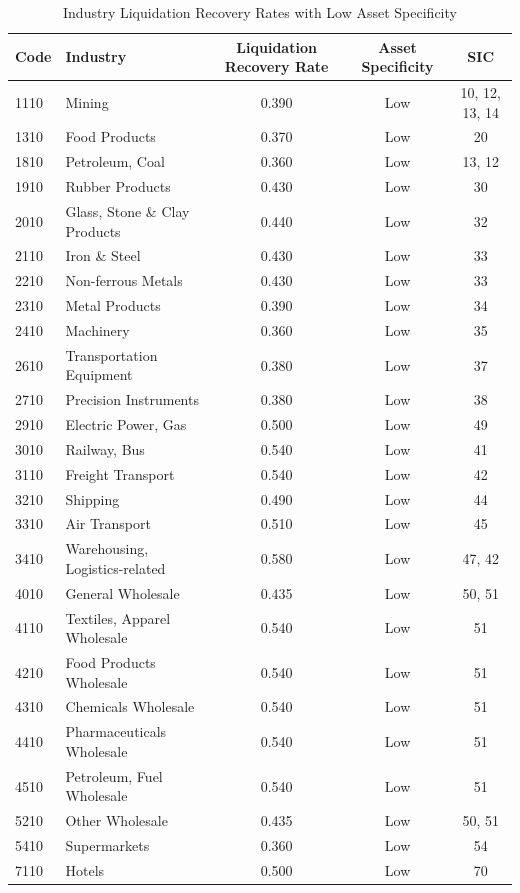 \begin{table}[ht]
\centering
\caption{Industry Liquidation Recovery Rates with Low Asset Specificity}
\label{tab:SpecificityLow}
\centering
\begin{threeparttable}
\begin{tabular}{llccc}
\toprule
\textbf{Code} & \textbf{Industry} & \textbf{Liquidation Recovery Rate} & \textbf{Asset Specificity} & \textbf{SIC} \\
\midrule
1110 & Mining & 0.390 & Low & 10, 12, 13, 14 \\
1310 & Food Products & 0.370 & Low & 20 \\
1810 & Petroleum, Coal & 0.360 & Low & 13, 12 \\
1910 & Rubber Products & 0.430 & Low & 30 \\
2010 & Glass, Stone \& Clay Products & 0.440 & Low & 32 \\
2110 & Iron \& Steel & 0.430 & Low & 33 \\
2210 & Non-ferrous Metals & 0.430 & Low & 33 \\
2310 & Metal Products & 0.390 & Low & 34 \\
2410 & Machinery & 0.360 & Low & 35 \\
2610 & Transportation Equipment & 0.380 & Low & 37 \\
2710 & Precision Instruments & 0.380 & Low & 38 \\
2910 & Electric Power, Gas & 0.500 & Low & 49 \\
3010 & Railway, Bus & 0.540 & Low & 41 \\
3110 & Freight Transport & 0.540 & Low & 42 \\
3210 & Shipping & 0.490 & Low & 44 \\
3310 & Air Transport & 0.510 & Low & 45 \\
3410 & Warehousing, Logistics-related & 0.580 & Low & 47, 42 \\
4010 & General Wholesale & 0.435 & Low & 50, 51 \\
4110 & Textiles, Apparel Wholesale & 0.540 & Low & 51 \\
4210 & Food Products Wholesale & 0.540 & Low & 51 \\
4310 & Chemicals Wholesale & 0.540 & Low & 51 \\
4410 & Pharmaceuticals Wholesale & 0.540 & Low & 51 \\
4510 & Petroleum, Fuel Wholesale & 0.540 & Low & 51 \\
5210 & Other Wholesale & 0.435 & Low & 50, 51 \\
5410 & Supermarkets & 0.360 & Low & 54 \\
7110 & Hotels & 0.500 & Low & 70 \\
\bottomrule
\end{tabular}


\end{threeparttable}
\end{table}
